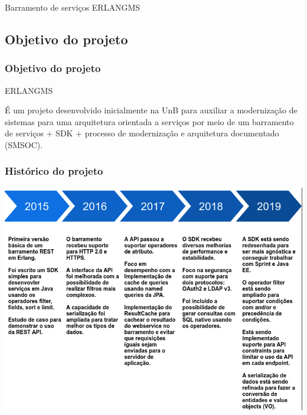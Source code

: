\documentclass{beamer}
\begin{document}
\begin{frame}[c]{ }
\centering
\huge{Barramento de serviços ERLANGMS}
\end{frame}


\subsection{Objetivo do projeto}


\begin{frame}
\frametitle{Objetivo do projeto}

\begin{exampleblock}{ERLANGMS}
	
	É um projeto desenvolvido inicialmente na UnB para auxiliar a modernização de sistemas para uma arquitetura orientada a serviços 
	por meio de um barramento de serviços + SDK + processo 
	de modernização e arquitetura documentado (SMSOC).
	
\end{exampleblock}


\end{frame}





\begin{frame}

	\frametitle{Histórico do projeto}

	\centering
	\includegraphics[scale=0.29]{img/historico.png}

\end{frame}
\end{document}
